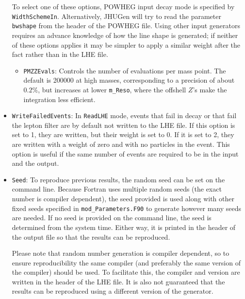 \documentclass[aps,superscriptaddress,nofootinbib]{revtex4}
\begin{document}
\begin{itemize}
\begin{itemize}
\end{itemize}
To select one of these options, POWHEG input decay mode is specified by \verb|WidthSchemeIn|.  Alternatively, JHUGen will try to read the parameter \verb|bwshape| from the header of the POWHEG file.  Using other input generators requires an advance knowledge of how the line shape is generated; if neither of these options applies it may be simpler to apply a similar weight after the fact rather than in the LHE file.
\begin{itemize}
\item \verb|PMZZEvals|: Controls the number of evaluations per mass point.  The default is 200000 at high masses, corresponding to a precision of about $0.2\%$, but increases at lower \verb|m_Reso|, where the offshell $Z$'s make the integration less efficient.
\end{itemize}
\item \verb|WriteFailedEvents|: In \verb|ReadLHE| mode, events that fail in decay or that fail the lepton filter are by default not written to the LHE file.  If this option is set to 1, they are written, but their weight is set to 0.  If it is set to 2, they are written with a weight of zero and with no particles in the event.  This option is useful if the same number of events are required to be in the input and the output.
\item \verb|Seed|: To reproduce previous results, the random seed can be set on the command line.  Because Fortran uses multiple random seeds (the exact number is compiler dependent), the seed provided is used along with other fixed seeds specified in \verb|mod_Parameters.F90| to generate however many seeds are needed.  If no seed is provided on the command line, the seed is determined from the system time.  Either way, it is printed in the header of the output file so that the results can be reproduced.

Please note that random number generation is compiler dependent, so to ensure reproducibility the same compiler (and preferably the same version of the compiler) should be used.  To facilitate this, the compiler and version are written in the header of the LHE file.  It is also not guaranteed that the results can be reproduced using a different version of the generator.


\end{itemize}
\end{document}
